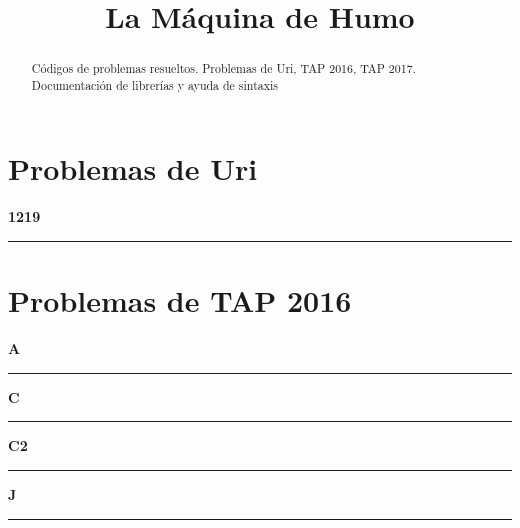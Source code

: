 \documentclass[a4paper, 12pt]{article}
\title{La Máquina de Humo}
\begin{document}
	\maketitle
	\begin{abstract} 
		Códigos de problemas resueltos. Problemas de Uri, TAP 2016, TAP 2017. Documentación 		de librerías y ayuda de sintaxis
	\end{abstract}
	\newpage
	\section{Problemas de Uri}
		\begin{center}{\Large\bf 1219}\\\noindent\rule{8cm}{0.4pt}\end{center}
		\newpage
	\section{Problemas de TAP 2016}
		\begin{center}{\Large\bf A}\\\noindent\rule{8cm}{0.4pt}\end{center}
		\newpage
		\begin{center}{\Large\bf C}\\\noindent\rule{8cm}{0.4pt}\end{center}
		
		\begin{center}{\Large\bf C2}\\\noindent\rule{8cm}{0.4pt}\end{center}
		\newpage
		\begin{center}{\Large\bf J}\\\noindent\rule{8cm}{0.4pt}\end{center}
		
\end{document}
